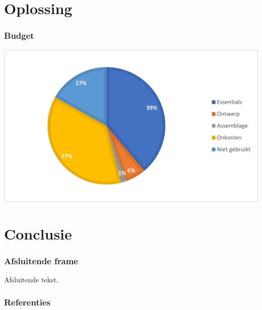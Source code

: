 \documentclass[aspectratio=169,kulak,t]{kulakbeamer} %
\begin{document}
\section{Oplossing}

\begin{frame}
	\frametitle{Budget}
	\begin{center}
		
		\includegraphics[width = 0.7 \textwidth]{pie}
		
	\end{center}
\end{frame}

\section{Conclusie}
\begin{frame}
\frametitle{Afsluitende frame}
Afsluitende tekst.
\end{frame}

\begin{frame}
	\frametitle{Referenties}
	
	
\end{frame}
\end{document}
